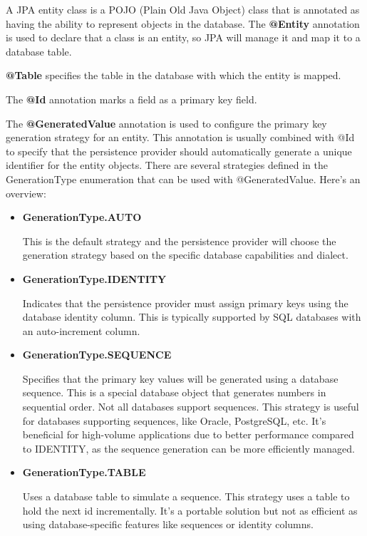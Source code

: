 A JPA entity class is a POJO (Plain Old Java Object) class  that is annotated as having the ability to represent objects in the database.
The \textbf{@Entity} annotation is used to declare that a class is an entity, so JPA will manage it and map it to a database table.

\textbf{@Table} specifies the table in the database with which the entity is mapped.

The \textbf{@Id} annotation marks a field as a primary key field.

The \textbf{@GeneratedValue} annotation is used to configure the primary key generation strategy for an entity. This annotation is usually combined with @Id to specify that the persistence provider should automatically generate a unique identifier for the entity objects. There are several strategies defined in the GenerationType enumeration that can be used with @GeneratedValue. Here's an overview:

\begin{itemize}
\item \textbf{GenerationType.AUTO}

This is the default strategy and the persistence provider will choose the generation strategy based on the specific database capabilities and dialect. 

\item \textbf{GenerationType.IDENTITY}

Indicates that the persistence provider must assign primary keys using the database identity column. This is typically supported by SQL databases with an auto-increment column.

\item \textbf{GenerationType.SEQUENCE}

Specifies that the primary key values will be generated using a database sequence. This is a special database object that generates numbers in sequential order. Not all databases support sequences.
This strategy is useful for databases supporting sequences, like Oracle, PostgreSQL, etc. It's beneficial for high-volume applications due to better performance compared to IDENTITY, as the sequence generation can be more efficiently managed.

\item \textbf{GenerationType.TABLE}

Uses a database table to simulate a sequence. This strategy uses a table to hold the next id incrementally. It's a portable solution but not as efficient as using database-specific features like sequences or identity columns.
\end{itemize}

